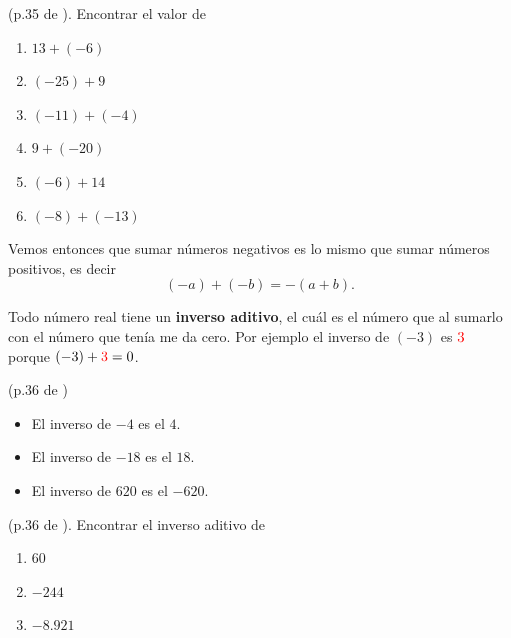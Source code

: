 \begin{exer}
	(p.35 de \cite{Dimensions_Math_7A}). Encontrar el valor de 
	\begin{multicols}{3}
		\begin{enumerate}[label=\Alph*)]
				\item $13+(-6)$
				\item $(-25)+9$
				\item $(-11)+(-4)$
				\item $9+(-20)$
				\item $(-6)+14$
				\item $(-8)+(-13)$
		\end{enumerate}
	\end{multicols}
\end{exer}

Vemos entonces que sumar números negativos es lo mismo que sumar números positivos, es decir
\[
		(-a)+(-b)=-(a+b).
\]

Todo número real tiene un \textbf{inverso aditivo}, el cuál es el número que al sumarlo con el número que tenía me da cero. Por ejemplo el inverso de $(-3)$ es $\color{red}3$ porque $(-3)+\color{red}3\color{black}=0$.

\begin{ejemplo}
		(p.36 de \cite{Dimensions_Math_7A})
		\begin{itemize}
				\item El inverso de $-4$ es el $4$.
				\item El inverso de $-18$ es el $18$.
				\item El inverso de $620$ es el $-620$.								
		\end{itemize}
\end{ejemplo}

\begin{exer}
	(p.36 de \cite{Dimensions_Math_7A}). Encontrar el inverso aditivo de 
	\begin{multicols}{3}
		\begin{enumerate}[label=\Alph*)]
			\item $60$
			\item $-244$
			\item $-8.921$
		\end{enumerate}
	\end{multicols}
\end{exer}

\newpage

